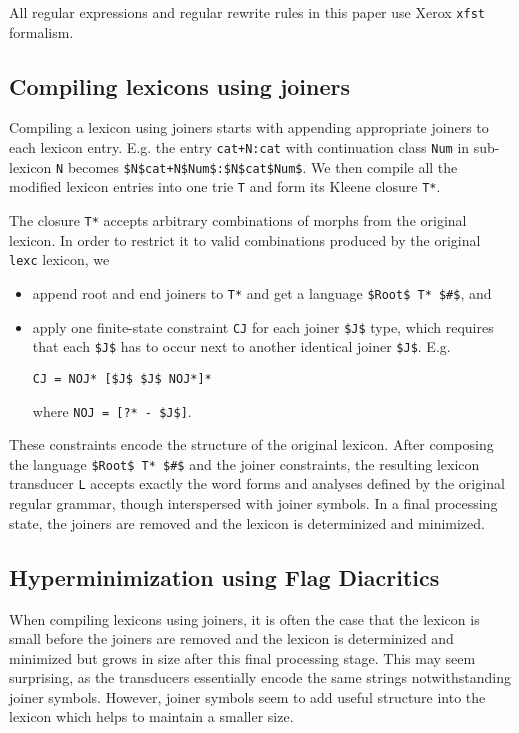 \documentclass[11pt]{article}
\begin{document}
All regular expressions and regular rewrite rules in this paper use
Xerox {\tt xfst} formalism.

\subsection{Compiling lexicons using joiners}
\label{cl}

Compiling a lexicon using joiners starts with appending appropriate joiners to each lexicon entry. E.g. the entry {\tt cat+N:cat} with continuation class {\tt Num} in sub-lexicon {\tt N} becomes {\tt \$N\$cat+N\$Num\$:\$N\$cat\$Num\$}. We then compile all the modified lexicon entries into one trie {\tt T} and form its Kleene closure {\tt T*}. 

The closure {\tt T*} accepts arbitrary combinations of morphs from the original lexicon. In order to restrict it to valid combinations produced by the original {\tt lexc} lexicon, we 

\begin{itemize}
\item append root and end joiners to {\tt T*} and get a language {\tt \$Root\$ T* \$\#\$}, and
\item apply one finite-state constraint {\tt CJ} for each joiner {\tt \$J\$} type, which requires that each {\tt \$J\$} has to occur next to another identical joiner {\tt \$J\$}. E.g.
\begin{verbatim}
CJ = NOJ* [$J$ $J$ NOJ*]*
\end{verbatim}
where {\tt NOJ = [?* - \$J\$]}.

\end{itemize}

These constraints encode the structure of the original lexicon. After
composing the language {\tt \$Root\$ T* \$\#\$} and the joiner
constraints, the resulting lexicon transducer {\tt L} accepts exactly
the word forms and analyses defined by the original regular grammar,
though interspersed with joiner symbols. In a final processing state,
the joiners are removed and the lexicon is determinized and minimized.

\subsection{Hyperminimization using Flag Diacritics}
\label{hm}

When compiling lexicons using joiners, it is often the case that the
lexicon is small before the joiners are removed and the lexicon is
determinized and minimized but grows in size after this final
processing stage. This may seem surprising, as the transducers
essentially encode the same strings notwithstanding joiner
symbols. However, joiner symbols seem to add useful structure into
the lexicon which helps to maintain a smaller size.
\end{document}
